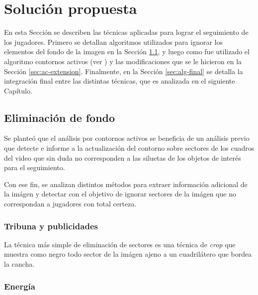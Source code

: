 \chapter{Solución propuesta}
\label{chap-solution}

En esta Sección se describen las técnicas aplicadas para lograr el seguimiento
de los jugadores. Primero se detallan algoritmos utilizados para ignorar los
elementos del fondo de la imagen en la Sección
\ref{sec:background-elimination}, y luego como fue utilizado el algoritmo
contornos activos (ver \cite{fast-level-set}) y las modificaciones que se le
hicieron en la Sección \ref{sec:ac-extension}. Finalmente, en la Sección
\ref{sec:alg-final} se detalla la integración final entre las distintas
técnicas, que es analizada en el siguiente Capítulo.

\section{Eliminación de fondo}

\label{sec:background-elimination}
Se planteó que el análisis por contornos activos se beneficia de un análisis
previo que detecte e informe a la actualización del contorno sobre sectores de
los cuadros del video que sin duda no corresponden a las siluetas de los
objetos de interés para el seguimiento.

Con ese fin, se analizan distintos métodos para extraer información adicional
de la imágen y detectar con el objetivo de ignorar sectores de la imágen que
no correspondan a jugadores con total certeza.

\subsection{Tribuna y publicidades}

La técnica más simple de eliminación de sectores es una técnica de
\textit{crop} que muestra como negro todo sector de la imágen ajeno a un
cuadrilátero que bordea la cancha.


\subsection{Energía}

